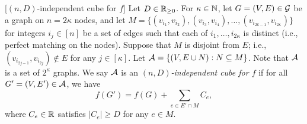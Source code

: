 \begin{definition}\label{def:mono-cube}[$(n,D)$-independent cube for $f$]
  Let 
  $D \in \mathbb{R}_{\ge0}$. 
  For 
  $\kappa \in \mathbb{N}$, 
  let $G=(V,E) \in \mathcal{G}$ be a graph on 
  $n = 2\kappa$ 
  nodes, and let 
  $M = \{(v_{i_1}, v_{i_2}),(v_{i_3},v_{i_4}),\ldots,(v_{i_{2k-1}},v_{i_{2\kappa}})\}$ 
  for integers $i_j \in [n]$ 
  be 
  a set of edges such that each of $i_1, \ldots, i_{2\kappa}$ is distinct (i.e., perfect matching on the nodes).
  Suppose that 
  $M$ is disjoint from 
  $E$; 
  i.e., 
  $(v_{i_{2j-1}}, v_{i_{2j}}) \notin E$ 
  for any 
  $j\in[\kappa]$. 
  Let 
  $\mathcal{A} = \{(V, E \cup N): N \subseteq M\}$.
  Note that 
  $\mathcal{A}$ is a set of 
  $2^\kappa$ 
  graphs.
  We say $\mathcal{A}$ 
  is 
  an \emph{$(n,D)$-independent cube for $f$} if for all
  $G'=(V,E') \in \mathcal{A}$, 
  we have
  \[
    f(G') = f(G) + \sum_{e \in E' \cap M} C_e,
  \]
  where $C_e \in \mathbb{R}$ satisfies $|C_e| \geq D$ for any $e \in M$.
\end{definition}

